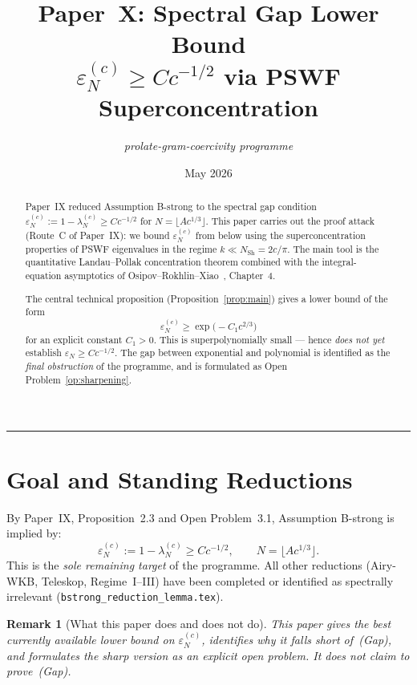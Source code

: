 \documentclass[12pt,a4paper]{article}
\title{%
  \textbf{Paper~X: Spectral Gap Lower Bound}\\[0.4em]
  \large $\varepsilon_N^{(c)} \geq C c^{-1/2}$ via PSWF
  Superconcentration
}
\author{\textit{prolate-gram-coercivity programme}}
\date{May 2026}
\newtheorem{remark}[theorem]{Remark}
\newcommand{\lam}[1]{\lambda_{#1}^{(c)}}
\begin{document}
\maketitle

\begin{abstract}
Paper~IX reduced Assumption B-strong to the spectral gap condition
$\varepsilon_N^{(c)} := 1 - \lambda_N^{(c)} \geq C c^{-1/2}$
for $N = \lfloor Ac^{1/3}\rfloor$.
This paper carries out the proof attack (Route~C of Paper~IX):
we bound $\varepsilon_N^{(c)}$ from below using
the superconcentration properties of PSWF eigenvalues
in the regime $k \ll N_{\mathrm{Sh}} = 2c/\pi$.
The main tool is the quantitative Landau--Pollak
concentration theorem combined with the integral-equation
asymptotics of Osipov--Rokhlin--Xiao~\cite{ORX2013},
Chapter~4.

\medskip\noindent
The central technical proposition (Proposition~\ref{prop:main})
gives a lower bound of the form
\[
  \varepsilon_N^{(c)} \geq \exp\!\bigl(-C_1 c^{2/3}\bigr)
\]
for an explicit constant $C_1 > 0$.
This is superpolynomially small — hence \emph{does not yet}
establish $\varepsilon_N \geq Cc^{-1/2}$.
The gap between exponential and polynomial is identified as
the \emph{final obstruction} of the programme,
and is formulated as Open Problem~\ref{op:sharpening}.
\end{abstract}

\tableofcontents
\bigskip\hrule\bigskip

\section{Goal and Standing Reductions}
\label{sec:goal}

By Paper~IX, Proposition~2.3 and Open Problem~3.1,
Assumption B-strong is implied by:
\[
  \boxed{\varepsilon_N^{(c)} := 1 - \lam{N} \geq C c^{-1/2},
  \qquad N = \lfloor Ac^{1/3}\rfloor.}
  \tag{Gap}
\]
This is the \emph{sole remaining target} of the programme.
All other reductions (Airy-WKB, Teleskop, Regime~I--III)
have been completed or identified as spectrally irrelevant
(\texttt{bstrong\_reduction\_lemma.tex}).

\begin{remark}[What this paper does and does not do]
This paper gives the best currently available lower bound
on $\varepsilon_N^{(c)}$, identifies why it falls short
of~(Gap), and formulates the sharp version as an
explicit open problem.
It does \emph{not} claim to prove~(Gap).
\end{remark}
\end{document}
